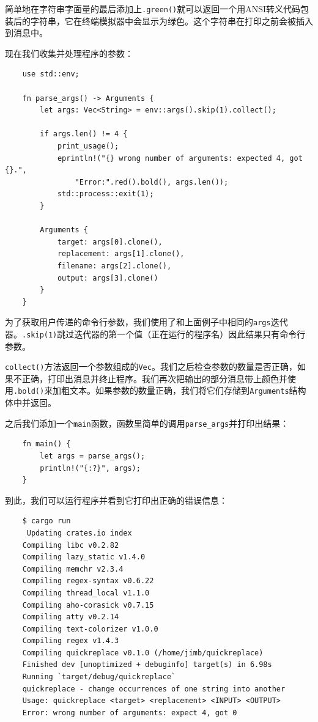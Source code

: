 简单地在字符串字面量的最后添加上\texttt{.green()}就可以返回一个用ANSI转义代码包装后的字符串，它在终端模拟器中会显示为绿色。这个字符串在打印之前会被插入到消息中。

现在我们收集并处理程序的参数：
\begin{verbatim}
    use std::env;

    fn parse_args() -> Arguments {
        let args: Vec<String> = env::args().skip(1).collect();

        if args.len() != 4 {
            print_usage();
            eprintln!("{} wrong number of arguments: expected 4, got {}.",
                "Error:".red().bold(), args.len());
            std::process::exit(1);
        }

        Arguments {
            target: args[0].clone(),
            replacement: args[1].clone(),
            filename: args[2].clone(),
            output: args[3].clone()
        }
    }
\end{verbatim}

为了获取用户传递的命令行参数，我们使用了和上面例子中相同的\texttt{args}迭代器。\texttt{.skip(1)}跳过迭代器的第一个值（正在运行的程序名）因此结果只有命令行参数。

\texttt{collect()}方法返回一个参数组成的\texttt{Vec}。我们之后检查参数的数量是否正确，如果不正确，打印出消息并终止程序。我们再次把输出的部分消息带上颜色并使用\texttt{.bold()}来加粗文本。如果参数的数量正确，我们将它们存储到\texttt{Arguments}结构体中并返回。

之后我们添加一个\texttt{main}函数，函数里简单的调用\texttt{parse\_args}并打印出结果：
\begin{verbatim}
    fn main() {
        let args = parse_args();
        println!("{:?}", args);
    }
\end{verbatim}

到此，我们可以运行程序并看到它打印出正确的错误信息：
\begin{verbatim}
    $ cargo run
     Updating crates.io index
    Compiling libc v0.2.82
    Compiling lazy_static v1.4.0
    Compiling memchr v2.3.4
    Compiling regex-syntax v0.6.22
    Compiling thread_local v1.1.0
    Compiling aho-corasick v0.7.15
    Compiling atty v0.2.14
    Compiling text-colorizer v1.0.0
    Compiling regex v1.4.3
    Compiling quickreplace v0.1.0 (/home/jimb/quickreplace)
    Finished dev [unoptimized + debuginfo] target(s) in 6.98s
    Running `target/debug/quickreplace`
    quickreplace - change occurrences of one string into another
    Usage: quickreplace <target> <replacement> <INPUT> <OUTPUT>
    Error: wrong number of arguments: expect 4, got 0
\end{verbatim}


